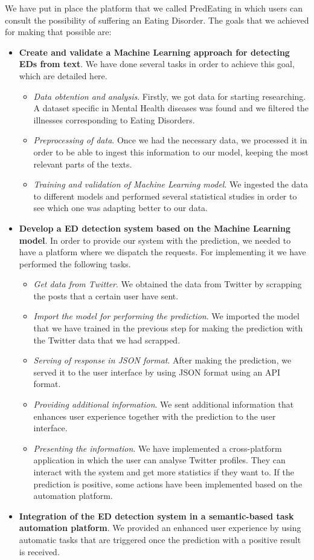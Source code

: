  We have put in place the platform that we called PredEating in which users can consult the possibility of suffering an Eating Disorder. The goals that we achieved for making that possible are:
\begin{itemize}

    \item \textbf{Create and validate a Machine Learning approach for detecting EDs from text}. We have done several tasks in order to achieve this goal, which are detailed here.
    \begin{itemize}
        \item \textit{Data obtention and analysis}. Firstly, we got data for starting researching. A dataset specific in Mental Health diseases was found and we filtered the illnesses corresponding to Eating Disorders.
        \item \textit{Preprocessing of data}. Once we had the necessary data, we processed it in order to be able to ingest this information to our model, keeping the most relevant parts of the texts.
        \item \textit{Training and validation of Machine Learning model}. We ingested the data to different models and performed several statistical studies in order to see which one was adapting better to our data.
    \end{itemize}
    \item \textbf{Develop a ED detection system based on the Machine Learning model}. In order to provide our system with the prediction, we needed to have a platform where we dispatch the requests. For implementing it we have performed the following tasks.
    \begin{itemize}
        \item \textit{Get data from Twitter}. We obtained the data from Twitter by scrapping the posts that a certain user have sent.
        \item \textit{Import the model for performing the prediction}. We imported the model that we have trained in the previous step for making the prediction with the Twitter data that we had scrapped.
        \item \textit{Serving of response in JSON format}. After making the prediction, we served it to the user interface by using JSON format using an API format.
        \item \textit{Providing additional information}. We sent additional information that enhances user experience together with the prediction to the user interface.
        \item \textit{Presenting the information}. We have implemented a cross-platform application in which the user can analyse Twitter profiles. They can interact with the system and get more statistics if they want to. If the prediction is positive, some actions have been implemented based on the automation platform.
    \end{itemize}
    \item \textbf{Integration of the ED detection system in a semantic-based task automation platform}. We provided an enhanced user experience by using automatic tasks that are triggered once the prediction with a positive result is received.
\end{itemize}

